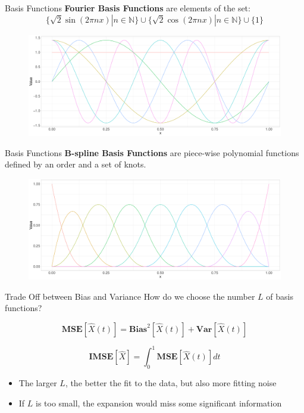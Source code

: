 \documentclass{beamer}
\begin{document}
	\begin{frame}{Basis Functions}
		\textbf{Fourier Basis Functions} are elements of the set:
		$$\{\sqrt{2}\sin(2\pi nx) | n \in \mathbb{N}\} \cup
		\{\sqrt{2}\cos(2\pi nx) | n \in \mathbb{N}\} \cup \{1\}$$
		\vspace{-0.5cm}
		\begin{figure}
			\includegraphics[width =
			\textwidth]{../Graphics/Fourier_Basis.pdf}
		\end{figure}
		
	\end{frame}
	
	\begin{frame}{Basis Functions}
		\textbf{B-spline Basis Functions} are piece-wise polynomial functions defined by
		an order and a set of knots.
		\begin{figure}
			\includegraphics[width =
			\textwidth]{../Graphics/Bspline_Basis.pdf}
		\end{figure}
	\end{frame}
	
	\begin{frame}{Trade Off between Bias and Variance}
		How do we choose the number $L$ of basis functions?
		
		$$\textbf{MSE}[\hat{X}(t)] = \textbf{Bias}^2[\hat{X}(t)] +
		\textbf{Var}[\hat{X}(t)]$$
		
		$$\textbf{IMSE}[\hat{X}] = \int_{0}^{1} \textbf{MSE}[\hat{X}(t)] dt$$
		
		\begin{itemize}
			\item The larger $L$, the better the fit to the data, but also more fitting noise
			\item If $L$ is too small, the expansion would miss some significant information
		\end{itemize}
	\end{frame}
	
\end{document}
